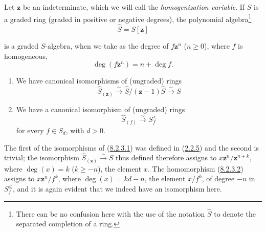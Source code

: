 \begin{env}[8.2.2]
\label{II.8.2.2}
Let $\mathbf{z}$ be an indeterminate, which we will call the \emph{homogenization
variable}. If $S$ is a graded ring (graded in positive or
negative degrees), the polynomial algebra\footnote{There can be no
confusion here with the use of the notation $\widehat{S}$ to denote the separated
completion of a ring.}
\begin{equation}
\label{II.8.2.2.1}
  \widehat{S}=S[\mathbf{z}]
\tag{8.2.2.1}
\end{equation}

is a graded $S$-algebra, when we take as the degree of $f\mathbf{z}^n$ ($n\geq0$), where
$f$ is homogeneous,
\begin{equation}
\label{II.8.2.2.2}
  \deg(f\mathbf{z}^n)=n+\deg f.
\tag{8.2.2.2}
\end{equation}
\end{env}

\begin{lemma}[8.2.3]
\label{II.8.2.3}
\begin{enumerate}
\item[\rm(i)] We have canonical isomorphisms of (ungraded) rings
\begin{equation}
\label{II.8.2.3.1}
  \widehat{S}_{(\mathbf{z})}\xrightarrow{\sim}
  \widehat{S}/(\mathbf{z}-1)\widehat{S}\xrightarrow{\sim}S
\tag{8.2.3.1}
\end{equation}
\item[\rm(ii)] We have a canonical isomorphism of (ungraded) rings
\begin{equation}
\label{II.8.2.3.2}
  \widehat{S}_{(f)}\xrightarrow{\sim}S_f^{\leq}
\tag{8.2.3.2}
\end{equation}
for every $f\in S_d$, with $d>0$.
\end{enumerate}
\end{lemma}

The first of the isomorphisms of (\hyperref[II.8.2.3.1]{8.2.3.1}) was
defined in (\hyperref[II.2.2.5]{2.2.5}) and the second is trivial;
the isomorphism $\widehat{S}_{(\mathbf{z})}\xrightarrow{\sim}S$ thus defined therefore
assigns to $x\mathbf{z}^n/\mathbf{z}^{n+k}$, where $\deg(x)=k$ ($k\geq-n$), the element $x$.
The homomorphism (\hyperref[II.8.2.3.2]{8.2.3.2}) assigns to
$x\mathbf{z}^n/f^k$, where $\deg(x)=kd-n$, the element $x/f^k$, of degree $-n$ in
$S_f^{\leq}$, and it is again evident that we indeed have an isomorphism here.

